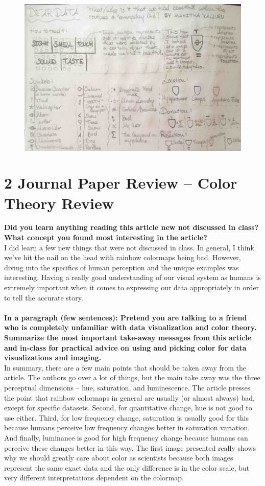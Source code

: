 \documentclass{neu_handout}
\begin{document}
\begin{figure}[h]
\centering
{
\includegraphics[page=1,width=0.4\linewidth]{penpal}
}
\end{figure}

\section*{2 Journal Paper Review – Color Theory Review}

\textbf{Did you learn anything reading this article new not discussed in class?  What concept you found most interesting in the article?}\\

I did learn a few new things that were not discussed in class. In general, I think we've hit the nail on the head with rainbow colormaps being bad. However, diving into the specifics of human perception and the unique examples was interesting. Having a really good understanding of our visual system as humans is extremely important when it comes to expressing our data appropriately in order to tell the accurate story. \\\\

\textbf{In a paragraph (few sentences): Pretend you are talking to a friend who is completely unfamiliar with data visualization and color theory.  Summarize the most important take-away messages from this article and in-class for practical advice on using and picking color for data visualizations and imaging.}\\

In summary, there are a few main points that should be taken away from the article. The authors go over a lot of things, but the main take away was the three perceptual dimensions – hue, saturation, and luminescence. The article presses the point that rainbow colormaps in general are usually (or almost always) bad, except for specific datasets. Second, for quantitative change, hue is not good to use either. Third, for low frequency change, saturation is usually good for this because humans perceive low frequency changes better in saturation variation. And finally, luminance is good for high frequency change because humans can perceive these changes better in this way. The first image presented really shows why we should greatly care about color as scientists because both images represent the same exact data and the only difference is in the color scale, but very different interpretations dependent on the colormap.
\end{document}
